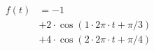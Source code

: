 \correct
\begin{center}
\begin{align*}
f(t) &= -1 \\
&+ 2 \cdot \cos( 1 \cdot 2 \pi \cdot t +\pi/3) \\
&+ 4 \cdot \cos( 2 \cdot 2 \pi \cdot t + \pi/4)
\end{align*}
\end{center}
